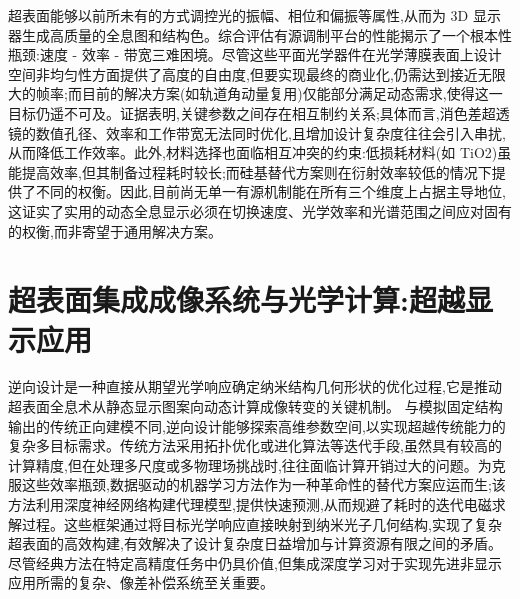 \documentclass[11pt]{article}
\begin{document}
超表面能够以前所未有的方式调控光的振幅、相位和偏振等属性,从而为 3D 显示器生成高质量的全息图和结构色。综合评估有源调制平台的性能揭示了一个根本性瓶颈:速度 - 效率 - 带宽三难困境。尽管这些平面光学器件在光学薄膜表面上设计空间非均匀性方面提供了高度的自由度,但要实现最终的商业化,仍需达到接近无限大的帧率;而目前的解决方案(如轨道角动量复用)仅能部分满足动态需求,使得这一目标仍遥不可及。证据表明,关键参数之间存在相互制约关系;具体而言,消色差超透镜的数值孔径、效率和工作带宽无法同时优化,且增加设计复杂度往往会引入串扰,从而降低工作效率。此外,材料选择也面临相互冲突的约束:低损耗材料(如 TiO2)虽能提高效率,但其制备过程耗时较长;而硅基替代方案则在衍射效率较低的情况下提供了不同的权衡。因此,目前尚无单一有源机制能在所有三个维度上占据主导地位,这证实了实用的动态全息显示必须在切换速度、光学效率和光谱范围之间应对固有的权衡,而非寄望于通用解决方案。\citep{doi_10_1515_nanoph_2025_0269_b999ce93} \citep{doi_10_1002_inf2_12116_b5c46838}

\section{超表面集成成像系统与光学计算:超越显示应用}\label{ux8d85ux8868ux9762ux96c6ux6210ux6210ux50cfux7cfbux7edfux4e0eux5149ux5b66ux8ba1ux7b97ux8d85ux8d8aux663eux793aux5e94ux7528}

逆向设计是一种直接从期望光学响应确定纳米结构几何形状的优化过程,它是推动超表面全息术从静态显示图案向动态计算成像转变的关键机制。\citep{doi_10_48550_arxiv_2506_21748_dc49c062} \citep{doi_10_1117_12_3099014_831c7349} 与模拟固定结构输出的传统正向建模不同,逆向设计能够探索高维参数空间,以实现超越传统能力的复杂多目标需求。传统方法采用拓扑优化或进化算法等迭代手段,虽然具有较高的计算精度,但在处理多尺度或多物理场挑战时,往往面临计算开销过大的问题。为克服这些效率瓶颈,数据驱动的机器学习方法作为一种革命性的替代方案应运而生;该方法利用深度神经网络构建代理模型,提供快速预测,从而规避了耗时的迭代电磁求解过程。这些框架通过将目标光学响应直接映射到纳米光子几何结构,实现了复杂超表面的高效构建,有效解决了设计复杂度日益增加与计算资源有限之间的矛盾。尽管经典方法在特定高精度任务中仍具价值,但集成深度学习对于实现先进非显示应用所需的复杂、像差补偿系统至关重要。\citep{doi_10_1088_1361_6439_ad3a72_72d60f33} \citep{doi_10_48550_arxiv_2204_00433_1c5cfd3e}
\end{document}
